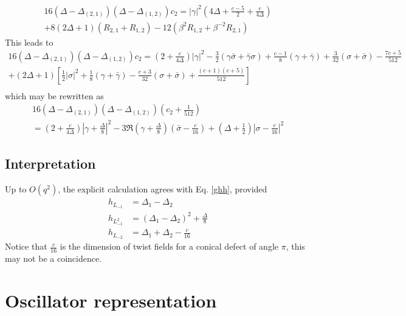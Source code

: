 \documentclass[12pt,a4paper]{article}
\begin{document}
\begin{multline}
 16(\Delta-\Delta_{(2,1)})(\Delta-\Delta_{(1,2)}) c_2 = |\gamma|^2\left(4\Delta + \tfrac{c-5}{2} + \tfrac{c}{4\Delta}\right)
 \\
 +8(2\Delta+1)(R_{2,1}+R_{1,2}) -12(\beta^2R_{1,2}+\beta^{-2}R_{2,1})
\end{multline}
This leads to 
\begin{multline}
 16(\Delta-\Delta_{(2,1)})(\Delta-\Delta_{(1,2)}) c_2 = \left(2+\frac{c}{4\Delta}\right)|\gamma|^2 
 -\tfrac32(\gamma\bar\sigma + \bar\gamma\sigma)+\tfrac{c-1}{8}(\gamma+\bar\gamma)+\tfrac{3}{32}(\sigma+\bar\sigma)-\tfrac{7c+5}{512}
 \\
 + (2\Delta+1)\left[\tfrac12|\sigma|^2 +\tfrac18 (\gamma+\bar\gamma) -\tfrac{c+3}{32}(\sigma+\bar\sigma)+\tfrac{(c+1)(c+5)}{512}\right] \\
\end{multline}
which may be rewritten as 
\begin{multline}
 16(\Delta-\Delta_{(2,1)})(\Delta-\Delta_{(1,2)}) \left(c_2+\tfrac{1}{512}\right) 
 \\
 = \left(2+\frac{c}{4\Delta}\right)\left|\gamma+\tfrac{\Delta}{8}\right|^2 
 -3\Re\left(\gamma+\tfrac{\Delta}{8}\right)\left(\bar\sigma-\tfrac{c}{16}\right)
 +\left(\Delta+\tfrac12\right)\left|\sigma-\tfrac{c}{16}\right|^2 
\end{multline}

\subsection{Interpretation}

Up to $O(q^2)$, the explicit calculation agrees with Eq. \eqref{ghh}, provided
\begin{subequations}
 \label{hl}
\begin{align}
 h_{L_{-1}} &= \Delta_1-\Delta_2
 \\
 h_{L_{-1}^2} &= (\Delta_1-\Delta_2)^2 +\frac{\Delta}{8}
 \\
 h_{L_{-2}} &= \Delta_1+\Delta_2-\frac{c}{16}
\end{align}
\end{subequations}
Notice that $\frac{c}{16}$ is the dimension of twist fields for a conical defect of angle $\pi$, this may not be a coincidence. 

\section{Oscillator representation}
\end{document}
